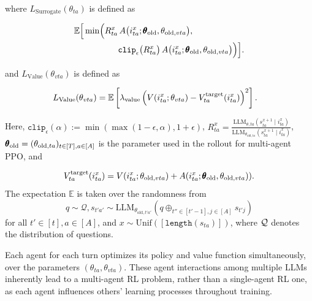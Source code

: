 \noindent where $L_{\text{Surrogate}}(\theta_{ta})$ is defined as {

\vspace{-5mm}

{\small \begin{align*}
\mathbb{E}\Bigl[
  &\min\Bigl(
    R_{ta}^x\,A\bigl(i_{ta}^x; \pmb{\theta}_{\text{old}}, \theta_{\text{old},vta}\bigr), 
     \\
    &\qquad \qquad \texttt{clip}_{\epsilon}\bigl(R_{ta}^x\bigr)\,
    A\bigl(i_{ta}^x; \pmb{\theta}_{\text{old}}, \theta_{\text{old},vta}\bigr)
  \Bigr)
\Bigr].
\end{align*}}
\safevspace{-7mm}

\noindent and $L_{\text{Value}}(\theta_{vta})$ is defined as 

\vspace{-5mm}


{\small 
\begin{align*}
    &L_{\text{Value}}(\theta_{vta}) = \mathbb{E} \left[\lambda_{\text{value}} \left(V(i_{ta}^x; \theta_{vta}) - V^\text{target}_{ta}(i_{ta}^x)\right)^2\right].
\end{align*}
} 
\vspace{-5mm}

\noindent Here, $\texttt{clip}_{\epsilon}(\alpha) := \min(\max(1-\epsilon, \alpha), 1+\epsilon)$, \( R_{ta}^x = \frac{\text{LLM}_{\theta, ta}(s^{x+1}_{ta} \mid i_{ta}^{x})}{\text{LLM}_{\theta_{\text{old}, ta}}(s^{x+1}_{ta} \mid i_{ta}^{x})} \), \(\pmb{\theta}_{\text{old}} = (\theta_{\text{old},{ta}})_{t\in[T], a \in [A]}\) is the parameter used in the rollout for multi-agent PPO, and 

\vspace{-5mm}
{\small \begin{align*}
    V_{ta}^{\text{target}}(i_{ta}^x) = V(i_{ta}^x; \theta_{\text{old}, vta}) + A(i_{ta}^x; \pmb{\theta}_{\text{old}}, \theta_{\text{old}, vta})).
\end{align*}}
\noindent The expectation \( \mathbb{E} \) is taken over the randomness from \[q \sim \mathcal{Q}, s_{t'a'} \sim \text{LLM}_{\theta_{\text{old}, t'a'}}(q \oplus_{t'' \in [t'-1], j \in [A]} s_{t'j}) \] for all $t' \in [t], a \in [A]$, and $x \sim \text{Unif}([\texttt{length}(s_{ta})])$, where $\mathcal{Q}$ denotes the distribution of questions.


Each agent for each turn optimizes its policy and value function simultaneously, over the parameters \((\theta_{ta}, \theta_{vta})\). These agent interactions among multiple LLMs inherently lead to a multi-agent RL problem, rather than a single-agent RL one, as each agent influences others' learning processes throughout training. 

}
